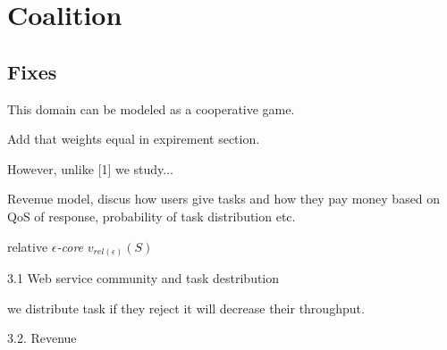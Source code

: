 \documentclass{article}
\begin{document}
  
\section{Coalition}
  
\subsection{Fixes}
  
This domain can be modeled as a cooperative game.
  
Add that weights equal in expirement section.
  
However, unlike [1] we study...
  
Revenue model, discus how users give tasks and how they pay money based on QoS of response, probability of task distribution etc.
  
relative \emph{$\epsilon$-core} $v_{rel(\epsilon)}(S)$
  
  
  3.1 Web service community and task destribution
  
  we distribute task if they reject it will decrease their throughput.
  
  3.2. Revenue
  
  
  
  
%
%
  
\end{document}
